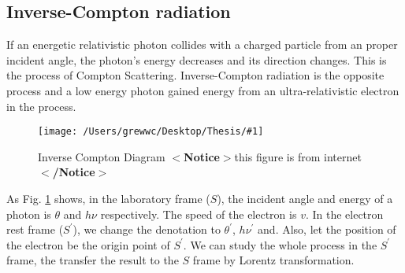 \documentclass[12pt]{report}
\newcommand{\mycaption}[1]{\protect \caption{#1}}
\newcommand{\singleFig}[3]{
 \begin{figure}[!ht]
  \centering
  \texttt{[image: /Users/grewwc/Desktop/Thesis/\#1]}
  \mycaption{#3}
 \label{fig: #1}
 \end{figure}
}
\newcommand{\Notice}[1]{
  $<$\textbf{Notice}$>$#1$<$\textbf{/Notice}$>$
}
\begin{document}
          \subsection{Inverse-Compton radiation}
            If an energetic relativistic photon collides with a charged particle from an proper incident angle,
            the photon's energy decreases and its direction changes. This is the process of Compton Scattering. 
            Inverse-Compton radiation is the opposite process and a low energy photon gained energy 
            from an ultra-relativistic electron in the process. 

            \singleFig{inverse_compton}{0.45}{Inverse Compton Diagram \Notice{this figure is from internet}}
            As Fig. \ref{fig: inverse_compton} shows, in the laboratory frame ($S$), the incident angle and 
            energy of a photon is $\theta$ and $h \nu$ respectively. The speed of the electron is $v$. In the 
            electron rest frame ($S^{\prime}$), we change the denotation to $\theta^{\prime}$, $h \nu^{\prime}$ and.
            Also, let the position of the electron be the origin point of $S^{\prime}$.
            We can study the whole process in the $S^{\prime}$ frame, the transfer the result 
            to the $S$ frame by Lorentz transformation. 
\end{document}
